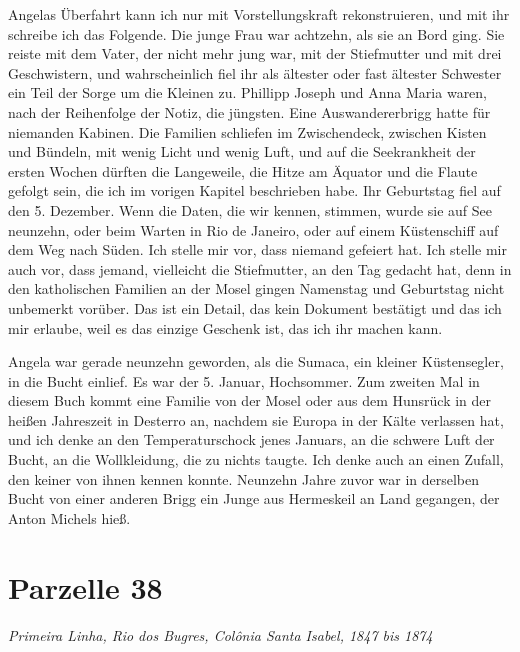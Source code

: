 \documentclass[
  ngerman,
  11pt,
  openany]{book}
\begin{document}
Angelas Überfahrt kann ich nur mit Vorstellungskraft rekonstruieren, und
mit ihr schreibe ich das Folgende. Die junge Frau war achtzehn, als sie
an Bord ging. Sie reiste mit dem Vater, der nicht mehr jung war, mit der
Stiefmutter und mit drei Geschwistern, und wahrscheinlich fiel ihr als
ältester oder fast ältester Schwester ein Teil der Sorge um die Kleinen
zu. Phillipp Joseph und Anna Maria waren, nach der Reihenfolge der
Notiz, die jüngsten. Eine Auswandererbrigg hatte für niemanden Kabinen.
Die Familien schliefen im Zwischendeck, zwischen Kisten und Bündeln, mit
wenig Licht und wenig Luft, und auf die Seekrankheit der ersten Wochen
dürften die Langeweile, die Hitze am Äquator und die Flaute gefolgt
sein, die ich im vorigen Kapitel beschrieben habe. Ihr Geburtstag fiel
auf den 5. Dezember. Wenn die Daten, die wir kennen, stimmen, wurde sie
auf See neunzehn, oder beim Warten in Rio de Janeiro, oder auf einem
Küstenschiff auf dem Weg nach Süden. Ich stelle mir vor, dass niemand
gefeiert hat. Ich stelle mir auch vor, dass jemand, vielleicht die
Stiefmutter, an den Tag gedacht hat, denn in den katholischen Familien
an der Mosel gingen Namenstag und Geburtstag nicht unbemerkt vorüber.
Das ist ein Detail, das kein Dokument bestätigt und das ich mir erlaube,
weil es das einzige Geschenk ist, das ich ihr machen kann.

Angela war gerade neunzehn geworden, als die Sumaca, ein kleiner
Küstensegler, in die Bucht einlief. Es war der 5. Januar, Hochsommer.
Zum zweiten Mal in diesem Buch kommt eine Familie von der Mosel oder aus
dem Hunsrück in der heißen Jahreszeit in Desterro an, nachdem sie Europa
in der Kälte verlassen hat, und ich denke an den Temperaturschock jenes
Januars, an die schwere Luft der Bucht, an die Wollkleidung, die zu
nichts taugte. Ich denke auch an einen Zufall, den keiner von ihnen
kennen konnte. Neunzehn Jahre zuvor war in derselben Bucht von einer
anderen Brigg ein Junge aus Hermeskeil an Land gegangen, der Anton
Michels hieß.

\section{Parzelle 38}\label{parzelle-38}

\emph{Primeira Linha, Rio dos Bugres, Colônia Santa Isabel, 1847 bis
1874}
\end{document}
